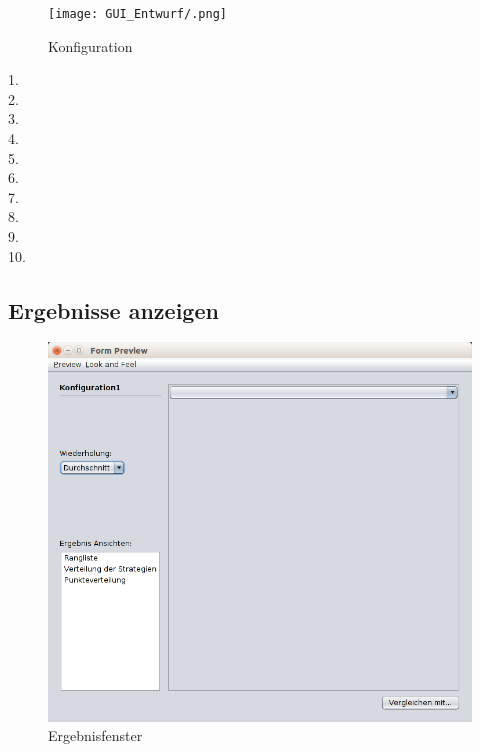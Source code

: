 \begin{figure}[hp] 
  \centering
     \texttt{[image: GUI\_Entwurf/.png]}
  \caption{Konfiguration}
  \label{fig:Bild2}
\end{figure}

\begin{description}

\item[1. ] 

\item[2. ] 

\item[3. ] 

\item[4. ] 

\item[5. ] 

\item[6. ] 

\item[7. ] 

\item[8. ] 

\item[9. ] 

\item[10. ] 

\end{description}

\pagebreak


\subsection{Ergebnisse anzeigen}

\begin{figure}[hp] 
  \centering
     \includegraphics[width=1.1\textwidth]{GUI_Entwurf/Ergebnisfenster(1).png}
  \caption{Ergebnisfenster}
  \label{fig:Bild7}
\end{figure}

